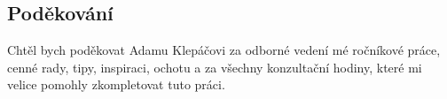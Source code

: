 \vspace*{\fill}
\subsection*{Poděkování}

Chtěl bych poděkovat Adamu Klepáčovi za odborné vedení mé ročníkové práce, cenné rady, tipy, inspiraci, ochotu a za všechny konzultační hodiny, které mi velice pomohly zkompletovat tuto práci.



